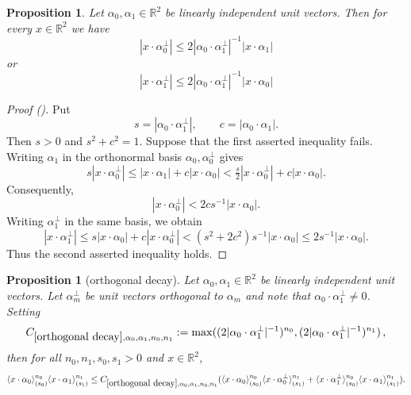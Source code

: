 \documentclass[12pt,reqno]{amsart}
\newcommand{\auto}{{({\tiny\faCar})}}
\theoremstyle{plain}
\newtheorem{proposition}[theorem]{Proposition}
\numberwithin{equation}{section}
\theoremstyle{remark}
\newcommand{\uses}[1]{}
\newcommand{\usesdefs}[1]{}
\newcommand{\R}{{\mathbb R}}
\begin{document}
\begin{proposition}\label{orthogonal domination}\uses{}\usesdefs{}
Let     $\alpha_0 ,\alpha_1\in\mathbb{R}^2$ be linearly independent unit vectors.
Then for every $x\in \R^2$ we have
 \begin{equation}\label{auto:orthogonal-coordinate-first-bound}
     |x\cdot \alpha_0^\perp|\le  2|\alpha_0\cdot \alpha_1^\perp|^{-1}| x\cdot \alpha_1|
 \end{equation}
or
 \begin{equation}\label{auto:orthogonal-coordinate-second-bound}
     | x\cdot \alpha_1^\perp|\le   2| \alpha_0\cdot \alpha_1^\perp|^{-1}|x\cdot \alpha_0|
 \end{equation}
\end{proposition}
\begin{proof}[Proof \auto]
Put
\[
s=|\alpha_0\cdot\alpha_1^\perp|,
\qquad
c=|\alpha_0\cdot\alpha_1|.
\]
Then $s>0$ and $s^2+c^2=1$. Suppose that the first asserted inequality fails. Writing $\alpha_1$ in the orthonormal basis $\alpha_0,\alpha_0^\perp$ gives
\[
s|x\cdot\alpha_0^\perp|
\le |x\cdot\alpha_1|+c|x\cdot\alpha_0|
<\tfrac{s}{2}|x\cdot\alpha_0^\perp|+c|x\cdot\alpha_0|.
\]
Consequently,
\[
|x\cdot\alpha_0^\perp|<2cs^{-1}|x\cdot\alpha_0|.
\]
Writing $\alpha_1^\perp$ in the same basis, we obtain
\[
|x\cdot\alpha_1^\perp|
\le s|x\cdot\alpha_0|+c|x\cdot\alpha_0^\perp|
<(s^2+2c^2)s^{-1}|x\cdot\alpha_0|
\le2s^{-1}|x\cdot\alpha_0|.
\]
Thus the second asserted inequality holds.
\end{proof}
\begin{proposition}[orthogonal decay]\label{orthogonal decay}\uses{compare brackets,orthogonal domination}\usesdefs{bracket bump}
Let $\alpha_0,\alpha_1\in\mathbb{R}^2$ be linearly independent unit vectors.
Let $\alpha_{m}^\perp$ be unit vectors orthogonal to $\alpha_m$ and note that $\alpha_0\cdot \alpha_1^\perp\neq 0$. Setting \begin{equation}\label{auto:orthogonal-decay-constant}
    C_{\ref{orthogonal decay}, \alpha_0,\alpha_1,n_0,n_1}:=\max( (2 |\alpha_0\cdot \alpha_1^\perp|^{-1})^{n_0},(2 |\alpha_0\cdot \alpha_1^\perp|^{-1})^{n_1}) \, ,
\end{equation}
then for all $n_0,n_1,s_0,s_1>0$ and $x\in\mathbb{R}^2$,
\begin{equation}\label{eq:two bump}
    \langle x\cdot \alpha_0\rangle_{(s_0)}^{n_0} \langle x\cdot \alpha_1\rangle_{(s_1)}^{n_1}
\le C_{\ref{orthogonal decay},\alpha_0,\alpha_1,n_0,n_1} (\langle x\cdot \alpha_0\rangle_{(s_0)}^{n_0} \langle x\cdot \alpha_0^\perp\rangle_{(s_1)}^{n_1} +
\langle x\cdot \alpha_1^\perp\rangle_{(s_0)}^{n_0} \langle x\cdot \alpha_1\rangle_{(s_1)}^{n_1}).
\end{equation}
\end{proposition}
\end{document}
